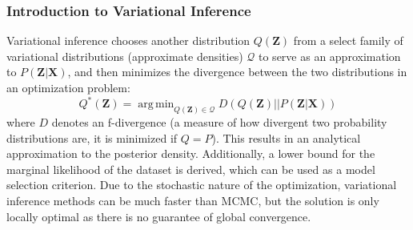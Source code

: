 \documentclass[a4paper,12pt]{article}
\DeclareMathOperator*{\argmin}{arg\,min}
\numberwithin{equation}{section}
\begin{document}
\subsubsection{Introduction to Variational Inference}
Variational inference chooses another distribution $Q(\textbf{Z})$ from a select family of variational distributions (approximate densities) $\mathcal{Q}$ to serve as an approximation to $P(\textbf{Z}|\textbf{X})$, and then minimizes the divergence between the two distributions in an optimization problem:
\begin{equation}
Q^*(\textbf{Z})=\argmin_{Q(\textbf{Z})\in \mathcal{Q}}D(Q(\textbf{Z})||P(\textbf{Z}|\textbf{X}))
\end{equation} where $D$ denotes an f-divergence (a measure of how divergent two probability distributions are, it is minimized if $Q=P$). This results in an analytical approximation to the posterior density. Additionally, a lower bound for the marginal likelihood of the dataset is derived, which can be used as a model selection criterion. Due to the stochastic nature of the optimization, variational inference methods can be much faster than MCMC, but the solution is only locally optimal as there is no guarantee of global convergence.
\end{document}
